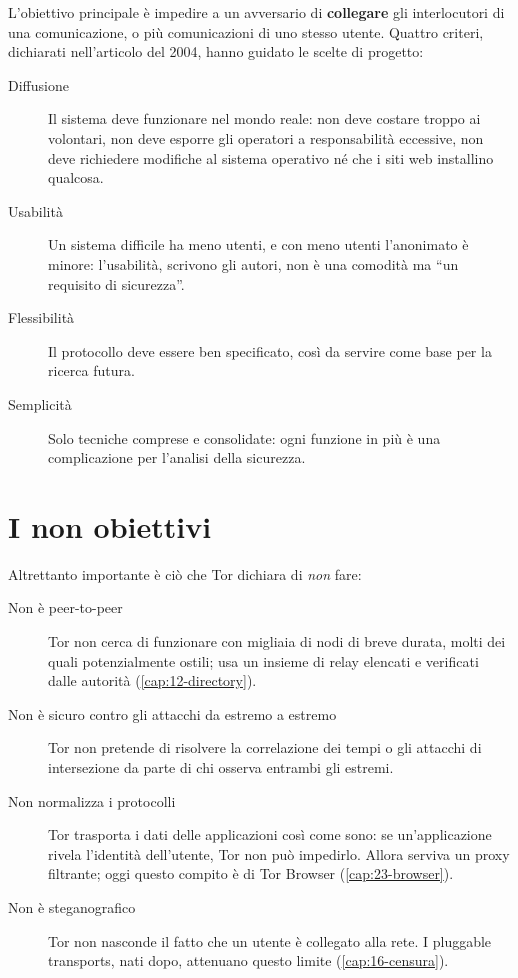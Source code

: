 L'obiettivo principale è impedire a un avversario di \textbf{collegare} gli interlocutori di una comunicazione, o più comunicazioni di uno stesso utente. Quattro criteri, dichiarati nell'articolo del 2004, hanno guidato le scelte di progetto:
\begin{description}
  \item[Diffusione] Il sistema deve funzionare nel mondo reale: non deve costare troppo ai volontari, non deve esporre gli operatori a responsabilità eccessive, non deve richiedere modifiche al sistema operativo né che i siti web installino qualcosa.
  \item[Usabilità] Un sistema difficile ha meno utenti, e con meno utenti l'anonimato è minore: l'usabilità, scrivono gli autori, non è una comodità ma \enquote{un requisito di sicurezza}.
  \item[Flessibilità] Il protocollo deve essere ben specificato, così da servire come base per la ricerca futura.
  \item[Semplicità] Solo tecniche comprese e consolidate: ogni funzione in più è una complicazione per l'analisi della sicurezza.
\end{description}

\section{I non obiettivi}\label{sec:minaccia-nonobiettivi}

Altrettanto importante è ciò che Tor dichiara di \emph{non} fare:
\begin{description}
  \item[Non è peer-to-peer] Tor non cerca di funzionare con migliaia di nodi di breve durata, molti dei quali potenzialmente ostili; usa un insieme di relay elencati e verificati dalle autorità (\cref{cap:12-directory}).
  \item[Non è sicuro contro gli attacchi da estremo a estremo] Tor non pretende di risolvere la correlazione dei tempi o gli attacchi di intersezione da parte di chi osserva entrambi gli estremi.
  \item[Non normalizza i protocolli] Tor trasporta i dati delle applicazioni così come sono: se un'applicazione rivela l'identità dell'utente, Tor non può impedirlo. Allora serviva un proxy filtrante; oggi questo compito è di Tor Browser (\cref{cap:23-browser}).
  \item[Non è steganografico] Tor non nasconde il fatto che un utente è collegato alla rete. I pluggable transports, nati dopo, attenuano questo limite (\cref{cap:16-censura}).
\end{description}

